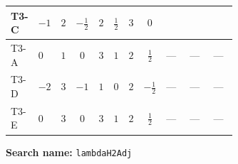 \documentclass[8pt]{article}
\begin{document}
\begin{landscape}
\begin{longtable}{@{}llcccccc >{\raggedright\arraybackslash}p{0.21\linewidth} >{\raggedright\arraybackslash}p{0.21\linewidth} >{\raggedright\arraybackslash}p{0.21\linewidth}@{}}
\midrule
T3-C & $-1$ & $2$ & $-\frac{1}{2}$ & $2$ & $\frac{1}{2}$ & $3$ & $0$ & \scriptsize\adjustbox{max width=\linewidth}{$\begin{gathered} {\lambda_{H2}^{\rm Adj}} (6 \operatorname{Tr}\!\left({Y_d}\,\left({Y_d}\right)^{\dagger}\right)+2 \operatorname{Tr}\!\left({Y_e}\,\left({Y_e}\right)^{\dagger}\right)+6 \operatorname{Tr}\!\left({Y_u}\,\left({Y_u}\right)^{\dagger}\right))\end{gathered}$} & \scriptsize\adjustbox{max width=\linewidth}{$\begin{gathered} -4 {\lambda_{S_1^\dagger S_2 S_2^{\dagger 2}}} \left({\lambda_{H H^\dagger S_1^\dagger S_2^\dagger}^{\rm Cross}}\right)^{*}\end{gathered}$} & \scriptsize\adjustbox{max width=\linewidth}{$\begin{gathered} -4 {\lambda_{H H^\dagger S_1^\dagger S_2^\dagger}^{\rm Cross}} (2 \left({\lambda_{H H^\dagger S_1^\dagger S_2^\dagger}^{\rm Cross}}\right)^{*}+\left({\lambda_{S_1^\dagger S_2 S_2^{\dagger 2}}}\right)^{*})\end{gathered}$} \\
\midrule
T3-A & $0$ & $1$ & $0$ & $3$ & $1$ & $2$ & $\frac{1}{2}$ & --- & --- & --- \\
\midrule
T3-D & $-2$ & $3$ & $-1$ & $1$ & $0$ & $2$ & $-\frac{1}{2}$ & --- & --- & --- \\
\midrule
T3-E & $0$ & $3$ & $0$ & $3$ & $1$ & $2$ & $\frac{1}{2}$ & --- & --- & --- \\
\midrule
\bottomrule
\end{longtable}
\clearpage
\noindent\textbf{Search name: }\texttt{lambdaH2Adj}\par\smallskip

\end{landscape}
\end{document}

